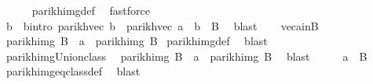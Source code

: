 \begin{isabellebody}
\ \ \ \ \isamarkupfalse%
\ parikh{\isacharunderscore}{\kern0pt}img{\isacharunderscore}{\kern0pt}def\ \isamarkupfalse%
\ fastforce\isanewline
\ \ \isamarkupfalse%
\ \isamarkupfalse%
\ b\ \ b{\isacharunderscore}{\kern0pt}intro{\isacharcolon}{\kern0pt}\ {\isachardoublequoteopen}parikh{\isacharunderscore}{\kern0pt}vec\ b\ {\isacharequal}{\kern0pt}\ parikh{\isacharunderscore}{\kern0pt}vec\ a\ {\isasymand}\ b\ {\isasymin}\ {\isacharquery}{\kern0pt}B{\isacharprime}{\kern0pt}{\isachardoublequoteclose}\ \isamarkupfalse%
\ blast\isanewline
\ \ \isamarkupfalse%
\ vec{\isacharunderscore}{\kern0pt}a{\isacharunderscore}{\kern0pt}in{\isacharunderscore}{\kern0pt}B{\isacharprime}{\kern0pt}\ \isamarkupfalse%
\ {\isachardoublequoteopen}parikh{\isacharunderscore}{\kern0pt}img\ {\isacharparenleft}{\kern0pt}{\isacharquery}{\kern0pt}B{\isacharprime}{\kern0pt}\ {\isasymunion}\ {\isacharbraceleft}{\kern0pt}a{\isacharbraceright}{\kern0pt}{\isacharparenright}{\kern0pt}\ {\isacharequal}{\kern0pt}\ parikh{\isacharunderscore}{\kern0pt}img\ {\isacharquery}{\kern0pt}B{\isacharprime}{\kern0pt}{\isachardoublequoteclose}\isamarkupfalse%
\ parikh{\isacharunderscore}{\kern0pt}img{\isacharunderscore}{\kern0pt}def\ \isamarkupfalse%
\ blast\isanewline
\ \ \isamarkupfalse%
\ parikh{\isacharunderscore}{\kern0pt}img{\isacharunderscore}{\kern0pt}Union{\isacharunderscore}{\kern0pt}class\ \isamarkupfalse%
\ {\isachardoublequoteopen}parikh{\isacharunderscore}{\kern0pt}img\ {\isacharparenleft}{\kern0pt}{\isacharquery}{\kern0pt}B{\isacharprime}{\kern0pt}\ {\isasymunion}\ {\isacharbraceleft}{\kern0pt}a{\isacharbraceright}{\kern0pt}{\isacharparenright}{\kern0pt}\ {\isacharequal}{\kern0pt}\ parikh{\isacharunderscore}{\kern0pt}img\ B{\isachardoublequoteclose}\ \isamarkupfalse%
\ blast\isanewline
\ \ \isamarkupfalse%
\ \isamarkupfalse%
\ {\isachardoublequoteopen}a\ {\isasymin}\ {\isacharquery}{\kern0pt}B{\isacharprime}{\kern0pt}{\isachardoublequoteclose}\ \isamarkupfalse%
\ parikh{\isacharunderscore}{\kern0pt}img{\isacharunderscore}{\kern0pt}eq{\isacharunderscore}{\kern0pt}class{\isacharunderscore}{\kern0pt}def\ \isamarkupfalse%
\ blast\isanewline
{}\isamarkupfalse%
%
\endisatagproof
{\isafoldproof}%
%
\isadelimproof
\isanewline
%
\endisadelimproof
\isanewline
%
\isadelimtheory
\isanewline
%
\endisadelimtheory
%
\isatagtheory
{}\isamarkupfalse%
%
\endisatagtheory
{\isafoldtheory}%
%
\isadelimtheory
%
\endisadelimtheory
%
\end{isabellebody}%
